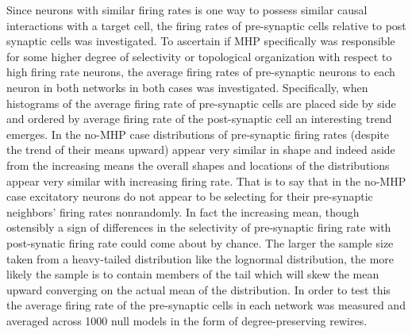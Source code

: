 \documentclass[10pt,letterpaper]{article}
\begin{document}
Since neurons with similar firing rates is one way to possess similar causal interactions with a target cell, the firing rates of pre-synaptic cells relative to post synaptic cells was investigated. To ascertain if MHP specifically was responsible for some higher degree of selectivity or topological organization with respect to high firing rate neurons, the average firing rates of pre-synaptic neurons to each neuron in both networks in both cases was investigated. Specifically, when histograms of the average firing rate of pre-synaptic cells are placed side by side and ordered by average firing rate of the post-synaptic cell an interesting trend emerges. In the no-MHP case distributions of pre-synaptic firing rates (despite the trend of their means upward) appear very similar in shape and indeed aside from the increasing means the overall shapes and locations of the distributions appear very similar with increasing firing rate. That is to say that in the no-MHP case excitatory neurons do not appear to be selecting for their pre-synaptic neighbors' firing rates nonrandomly. In fact the increasing mean, though ostensibly a sign of differences in the selectivity of pre-synaptic firing rate with post-synatic firing rate could come about by chance. The larger the sample size taken from a heavy-tailed distribution like the lognormal distribution, the more likely the sample is to contain members of the tail which will skew the mean upward converging on the actual mean of the distribution. In order to test this the average firing rate of the pre-synaptic cells in each network was measured and averaged across 1000 null models in the form of degree-preserving rewires. 
\end{document}
